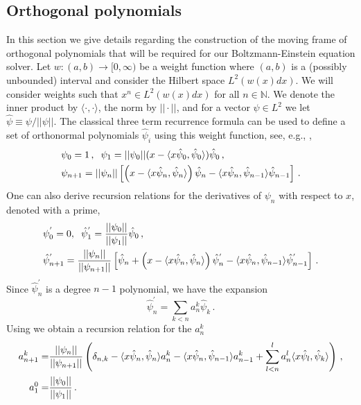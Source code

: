 \subsection{Orthogonal polynomials}\label{sec:orthopolyApp}
In this section we give details regarding the construction of the moving frame of orthogonal polynomials that will be required for our Boltzmann-Einstein equation solver.
Let $w:(a,b)\rightarrow [0,\infty)$ be a weight function where $(a,b)$ is a (possibly unbounded) interval and consider the Hilbert space $L^2(w(x) dx)$.   We will consider weights such that $x^n\in L^2(w(x) dx)$ for all $n\in\mathbb{N}$. We denote the inner product by $\langle\cdot,\cdot\rangle$, the norm by $||\cdot||$, and for a vector $\psi\in L^2$ we let $\hat{\psi}\equiv \psi/||\psi||$.  The classical three term recurrence formula can be used to define a set of orthonormal polynomials $\hat{\psi}_i$ using this weight function, see, e.g.,  \cite{Olver},
\begin{align}\label{polyRecursion}
&\psi_0=1\,, \hspace{2mm} \psi_1=||\psi_0||(x-\langle x\hat\psi_0,\hat{\psi}_0\rangle)\hat{\psi}_0\,,\\
&\psi_{n+1}=||\psi_n||\left[\left(x-\langle x\hat\psi_n,\hat\psi_n\rangle\right)\hat\psi_n-\langle x\hat\psi_n,\hat\psi_{n-1}\rangle\hat\psi_{n-1}\right]\,.\notag
\end{align}
One can also derive recursion relations for the derivatives of $\psi_n$ with respect to $x$, denoted with a prime,
\begin{align}\label{derivRec}
&\psi_0^{'}=0, \hspace{2mm} \hat{\psi}_1^{'}=\frac{||\psi_0||}{||\psi_1||}\hat\psi_0\,,\\
&\hat{\psi}_{n+1}^{'}=\frac{||\psi_n||}{||\psi_{n+1}||}\left[\hat\psi_n+\left(x-\langle x\hat\psi_n,\hat\psi_n\rangle\right)\hat{\psi}_n^{'}-\langle x\hat\psi_n,\hat\psi_{n-1}\rangle\hat{\psi}_{n-1}^{'}\right]\,.\notag
\end{align}
Since $\hat{\psi}_n^{'}$ is a degree $n-1$ polynomial, we have the expansion 
\begin{equation}
\hat{\psi}_n^{'}=\sum_{k<n} a_n^k \hat{\psi}_k\,.
\end{equation}
Using  we obtain a recursion relation for the $a_n^k$
\begin{align}
a_{n+1}^k=&\frac{||\psi_n||}{||\psi_{n+1}||}\left(\delta_{n,k}-\langle x\hat\psi_n,\hat\psi_{n}\rangle a_n^k-\langle x\hat\psi_n,\hat\psi_{n-1}\rangle a_{n-1}^k+\sum_{l<n}^la_n^l\langle x\hat\psi_l,\hat\psi_k\rangle\right)\,,\notag\\
a_1^0=&\frac{||\psi_0||}{||\psi_1||}\,.\notag
\end{align}

